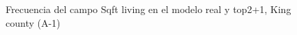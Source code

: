 \begin{figure}[H]
    \centering
    
    \caption{Frecuencia del campo Sqft living en el modelo real y top2+1, King county (A-1)}
    \label{frecuency-top2+1-sqft living}
\end{figure}